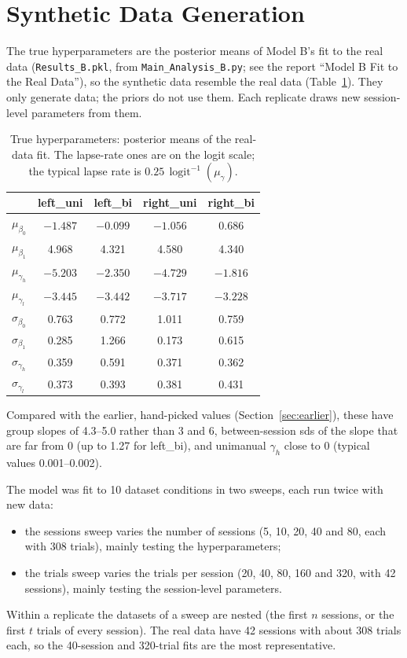 \documentclass[11pt]{article}
\newcommand{\invlogit}{\operatorname{logit}^{-1}}
\newcommand{\code}[1]{\texttt{#1}}
\begin{document}
\section{Synthetic Data Generation}

The true hyperparameters are the posterior means of Model B's fit to the real data
(\code{Results\_B.pkl}, from \code{Main\_Analysis\_B.py}; see the report ``Model B Fit
to the Real Data''), so the synthetic data resemble the real data
(Table~\ref{tab:true}). They only generate data; the priors do not use them. Each
replicate draws new session-level parameters from them.

\begin{table}[H]
\centering
\caption{True hyperparameters: posterior means of the real-data fit. The lapse-rate
ones are on the logit scale; the typical lapse rate is $0.25\,\invlogit(\mu_\gamma)$.}
\label{tab:true}
\begin{tabular}{lcccc}
\toprule
 & left\_uni & left\_bi & right\_uni & right\_bi \\
\midrule
$\mu_{\beta_0}$     & $-1.487$ & $-0.099$ & $-1.056$ & 0.686 \\
$\mu_{\beta_1}$     & 4.968 & 4.321 & 4.580 & 4.340 \\
$\mu_{\gamma_h}$    & $-5.203$ & $-2.350$ & $-4.729$ & $-1.816$ \\
$\mu_{\gamma_l}$    & $-3.445$ & $-3.442$ & $-3.717$ & $-3.228$ \\
$\sigma_{\beta_0}$  & 0.763 & 0.772 & 1.011 & 0.759 \\
$\sigma_{\beta_1}$  & 0.285 & 1.266 & 0.173 & 0.615 \\
$\sigma_{\gamma_h}$ & 0.359 & 0.591 & 0.371 & 0.362 \\
$\sigma_{\gamma_l}$ & 0.373 & 0.393 & 0.381 & 0.431 \\
\bottomrule
\end{tabular}
\end{table}

Compared with the earlier, hand-picked values (Section~\ref{sec:earlier}), these
have group slopes of 4.3--5.0 rather than 3 and 6, between-session sds of the slope
that are far from 0 (up to 1.27 for left\_bi), and unimanual $\gamma_h$ close to 0
(typical values 0.001--0.002).

The model was fit to 10 dataset conditions in two sweeps, each run twice with new data:
\begin{itemize}
  \item the sessions sweep varies the number of sessions (5, 10, 20, 40 and 80, each
        with 308 trials), mainly testing the hyperparameters;
  \item the trials sweep varies the trials per session (20, 40, 80, 160 and 320, with
        42 sessions), mainly testing the session-level parameters.
\end{itemize}
Within a replicate the datasets of a sweep are nested (the first $n$ sessions, or the
first $t$ trials of every session). The real data have 42 sessions with about 308
trials each, so the 40-session and 320-trial fits are the most representative.
\end{document}
